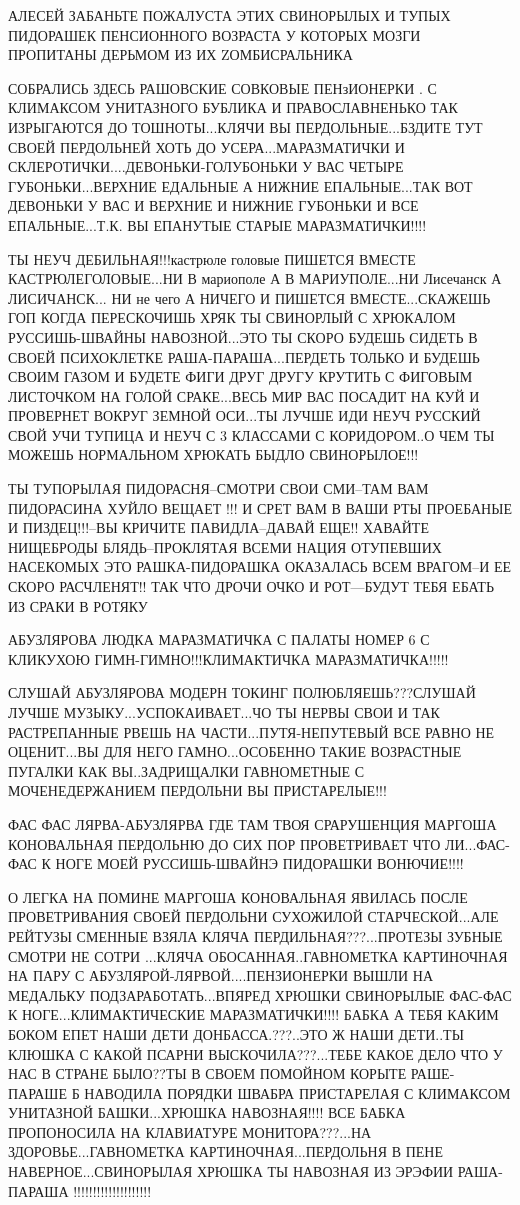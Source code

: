 АЛЕСЕЙ ЗАБАНЬТЕ ПОЖАЛУСТА ЭТИХ СВИНОРЫЛЫХ И ТУПЫХ ПИДОРАШЕК ПЕНСИОННОГО
ВОЗРАСТА У КОТОРЫХ МОЗГИ ПРОПИТАНЫ ДЕРЬМОМ ИЗ ИХ ZОМБИСРАЛЬНИКА


СОБРАЛИСЬ ЗДЕСЬ РАШОВСКИЕ СОВКОВЫЕ ПЕНзИОНЕРКИ . С КЛИМАКСОМ УНИТАЗНОГО БУБЛИКА
И ПРАВОСЛАВНЕНЬКО ТАК ИЗРЫГАЮТСЯ ДО ТОШНОТЫ...КЛЯЧИ ВЫ ПЕРДОЛЬНЫЕ...БЗДИТЕ ТУТ
СВОЕЙ ПЕРДОЛЬНЕЙ ХОТЬ ДО УСЕРА...МАРАЗМАТИЧКИ И
СКЛЕРОТИЧКИ....ДЕВОНЬКИ-ГОЛУБОНЬКИ У ВАС ЧЕТЫРЕ ГУБОНЬКИ...ВЕРХНИЕ ЕДАЛЬНЫЕ А
НИЖНИЕ ЕПАЛЬНЫЕ...ТАК ВОТ ДЕВОНЬКИ У ВАС И ВЕРХНИЕ И НИЖНИЕ ГУБОНЬКИ И ВСЕ
ЕПАЛЬНЫЕ...Т.К. ВЫ ЕПАНУТЫЕ СТАРЫЕ МАРАЗМАТИЧКИ!!!!            

ТЫ НЕУЧ ДЕБИЛЬНАЯ!!!кастрюле головые ПИШЕТСЯ ВМЕСТЕ КАСТРЮЛЕГОЛОВЫЕ...НИ В
мариополе А В МАРИУПОЛЕ...НИ Лисечанск А ЛИСИЧАНСК... НИ не чего А НИЧЕГО И
ПИШЕТСЯ ВМЕСТЕ...СКАЖЕШЬ ГОП КОГДА ПЕРЕСКОЧИШЬ ХРЯК ТЫ СВИНОРЛЫЙ С ХРЮКАЛОМ
РУССИШЬ-ШВАЙНЫ НАВОЗНОЙ...ЭТО ТЫ СКОРО БУДЕШЬ СИДЕТЬ В СВОЕЙ ПСИХОКЛЕТКЕ
РАША-ПАРАША...ПЕРДЕТЬ ТОЛЬКО И БУДЕШЬ СВОИМ ГАЗОМ И БУДЕТЕ ФИГИ ДРУГ ДРУГУ
КРУТИТЬ С ФИГОВЫМ ЛИСТОЧКОМ НА ГОЛОЙ СРАКЕ...ВЕСЬ МИР ВАС ПОСАДИТ НА КУЙ И
ПРОВЕРНЕТ ВОКРУГ ЗЕМНОЙ ОСИ...ТЫ ЛУЧШЕ ИДИ НЕУЧ РУССКИЙ СВОЙ УЧИ ТУПИЦА И НЕУЧ
С 3 КЛАССАМИ С КОРИДОРОМ..О ЧЕМ ТЫ МОЖЕШЬ НОРМАЛЬНОМ ХРЮКАТЬ БЫДЛО
СВИНОРЫЛОЕ!!!       

ТЫ ТУПОРЫЛАЯ ПИДОРАСНЯ--СМОТРИ СВОИ СМИ--ТАМ ВАМ ПИДОРАСИНА ХУЙЛО ВЕЩАЕТ !!! И
СРЕТ ВАМ В ВАШИ РТЫ ПРОЕБАНЫЕ И ПИЗДЕЦ!!!--ВЫ КРИЧИТЕ ПАВИДЛА--ДАВАЙ ЕЩЕ!!
ХАВАЙТЕ НИЩЕБРОДЫ БЛЯДЬ--ПРОКЛЯТАЯ ВСЕМИ НАЦИЯ ОТУПЕВШИХ НАСЕКОМЫХ ЭТО
РАШКА-ПИДОРАШКА ОКАЗАЛАСЬ ВСЕМ ВРАГОМ--И ЕЕ СКОРО РАСЧЛЕНЯТ!! ТАК ЧТО ДРОЧИ
ОЧКО И РОТ---БУДУТ ТЕБЯ ЕБАТЬ ИЗ СРАКИ В РОТЯКУ

АБУЗЛЯРОВА ЛЮДКА МАРАЗМАТИЧКА С ПАЛАТЫ НОМЕР 6 С КЛИКУХОЮ
ГИМН-ГИМНО!!!КЛИМАКТИЧКА МАРАЗМАТИЧКА!!!!! 

СЛУШАЙ АБУЗЛЯРОВА МОДЕРН ТОКИНГ ПОЛЮБЛЯЕШЬ???СЛУШАЙ ЛУЧШЕ
МУЗЫКУ...УСПОКАИВАЕТ...ЧО ТЫ НЕРВЫ СВОИ И ТАК РАСТРЕПАННЫЕ РВЕШЬ НА
ЧАСТИ...ПУТЯ-НЕПУТЕВЫЙ ВСЕ РАВНО НЕ ОЦЕНИТ...ВЫ ДЛЯ НЕГО ГАМНО...ОСОБЕННО ТАКИЕ
ВОЗРАСТНЫЕ ПУГАЛКИ КАК ВЫ..ЗАДРИЩАЛКИ ГАВНОМЕТНЫЕ С МОЧЕНЕДЕРЖАНИЕМ ПЕРДОЛЬНИ
ВЫ ПРИСТАРЕЛЫЕ!!! 

ФАС ФАС ЛЯРВА-АБУЗЛЯРВА ГДЕ ТАМ ТВОЯ СРАРУШЕНЦИЯ МАРГОША КОНОВАЛЬНАЯ ПЕРДОЛЬНЮ
ДО СИХ ПОР ПРОВЕТРИВАЕТ ЧТО ЛИ...ФАС-ФАС К НОГЕ МОЕЙ РУССИШЬ-ШВАЙНЭ ПИДОРАШКИ
ВОНЮЧИЕ!!!! 

О ЛЕГКА НА ПОМИНЕ МАРГОША КОНОВАЛЬНАЯ ЯВИЛАСЬ ПОСЛЕ ПРОВЕТРИВАНИЯ СВОЕЙ
ПЕРДОЛЬНИ СУХОЖИЛОЙ СТАРЧЕСКОЙ...АЛЕ РЕЙТУЗЫ СМЕННЫЕ ВЗЯЛА КЛЯЧА
ПЕРДИЛЬНАЯ???...ПРОТЕЗЫ ЗУБНЫЕ СМОТРИ НЕ СОТРИ ...КЛЯЧА ОБОСАННАЯ..ГАВНОМЕТКА
КАРТИНОЧНАЯ НА ПАРУ С АБУЗЛЯРОЙ-ЛЯРВОЙ....ПЕНЗИОНЕРКИ ВЫШЛИ НА МЕДАЛЬКУ
ПОДЗАРАБОТАТЬ...ВПЯРЕД ХРЮШКИ СВИНОРЫЛЫЕ ФАС-ФАС К НОГЕ...КЛИМАКТИЧЕСКИЕ
МАРАЗМАТИЧКИ!!!!
БАБКА А ТЕБЯ КАКИМ БОКОМ ЕПЕТ НАШИ ДЕТИ ДОНБАССА.???..ЭТО Ж НАШИ ДЕТИ..ТЫ
КЛЮШКА С КАКОЙ ПСАРНИ ВЫСКОЧИЛА???...ТЕБЕ КАКОЕ ДЕЛО ЧТО У НАС В СТРАНЕ
БЫЛО??ТЫ В СВОЕМ ПОМОЙНОМ КОРЫТЕ РАШЕ-ПАРАШЕ Б НАВОДИЛА ПОРЯДКИ ШВАБРА
ПРИСТАРЕЛАЯ С КЛИМАКСОМ УНИТАЗНОЙ БАШКИ...ХРЮШКА НАВОЗНАЯ!!!!     ВСЕ БАБКА
ПРОПОНОСИЛА НА КЛАВИАТУРЕ МОНИТОРА???...НА ЗДОРОВЬЕ...ГАВНОМЕТКА
КАРТИНОЧНАЯ...ПЕРДОЛЬНЯ В ПЕНЕ НАВЕРНОЕ...СВИНОРЫЛАЯ ХРЮШКА ТЫ НАВОЗНАЯ ИЗ
ЭРЭФИИ РАША-ПАРАША !!!!!!!!!!!!!!!!!!!!       

